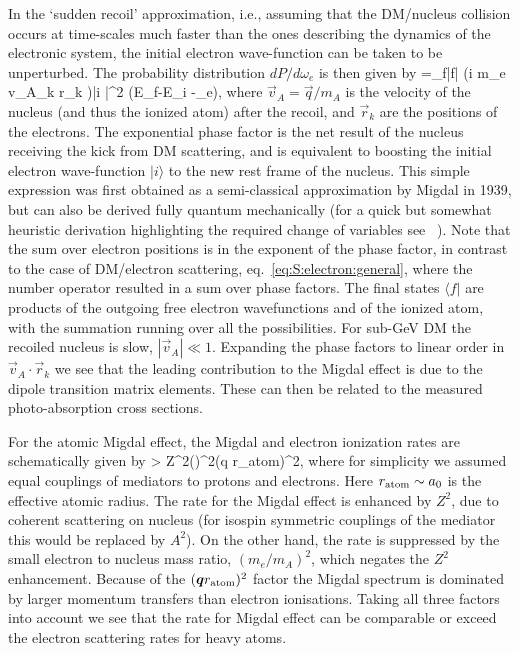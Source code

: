 In the `sudden recoil' approximation, i.e., assuming that the DM/nucleus collision occurs at time-scales much faster than the ones describing the dynamics of the electronic system, the initial electron wave-function can be taken to be unperturbed. The probability distribution $dP/d\omega_e$ is then given by
\beq
{}=\sum_f\big|\big\langle f\big| \exp\Big(i m_e \vec v_A\cdot \sum_k \vec r_k \Big)\big|i \big\rangle \big|^2 \delta \big(E_f-E_i -\omega_e\big),
\eeq
where $\vec v_A=\vec q/m_A$ is the velocity of the nucleus (and thus the ionized atom) after the recoil, and $\vec r_k$ are the positions of the electrons. 
The exponential phase factor is the net result of the nucleus receiving the kick from DM scattering, and is equivalent  to boosting the initial electron wave-function $|i \rangle$ to the new rest frame of the nucleus.
This simple expression was first obtained as a semi-classical approximation by Migdal in 1939, but can also be derived fully quantum mechanically \cite{Baur:Rossel:1983} (for a quick but somewhat heuristic derivation highlighting the required change of variables see ~\cite{dm:light:review}).
Note that the sum over electron positions is in the exponent of the phase factor, in contrast to the case of DM/electron scattering, eq.~\eqref{eq:S:electron:general}, where the number operator resulted in a sum over phase factors. The final states $\langle f|$ are products of the outgoing free electron wavefunctions and of the ionized atom, with the summation running over all the possibilities.  For sub-GeV DM the recoiled nucleus is slow, $|\vec v_A|\ll 1$. Expanding the phase factors to linear order in $\vec v_A\cdot \vec r_k$ we see that the leading contribution to the Migdal effect is due to the dipole transition matrix elements. These can then be related to the measured photo-absorption cross sections. 



\medskip

For the atomic Migdal effect, the Migdal and electron ionization rates are schematically given by 
\beq
\label{eq:Migdal:ion}
> Z^2\biggr(\biggr)^2(\vec q r_{\rm atom})^2,
\eeq
where for simplicity we assumed equal couplings of mediators to protons and electrons. Here $r_{\rm atom}\sim a_0$ is the effective atomic radius. The rate for the Migdal effect is enhanced by $Z^2$, due to coherent scattering on nucleus (for isospin symmetric couplings of the mediator this would be replaced by $A^2$).  
On the other hand, the rate is suppressed by the small electron to nucleus mass ratio, $(m_e/m_A)^2$, 
which negates the $Z^2$ enhancement. 
Because of the $(\vec q r_{\rm atom})^2$ factor the Migdal spectrum is dominated by larger momentum transfers than electron ionisations. Taking all three factors into account we see that the rate for Migdal effect can be comparable or exceed the electron scattering rates for heavy atoms. 

